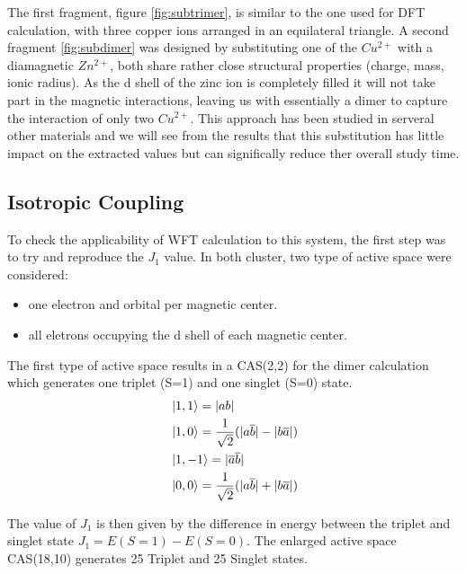 \documentclass[10pt]{report}
\numberwithin{equation}{section}
\begin{document}
The first fragment, figure \ref{fig:subtrimer}, is similar to the one used for DFT calculation, with three copper ions arranged in an equilateral triangle. 
A second fragment \ref{fig:subdimer} was designed by substituting one of the $Cu^{2+}$ with a diamagnetic $Zn^{2+}$, both share rather close structural properties (charge, mass, ionic radius).
As the d shell of the zinc ion is completely filled it will not take part in the magnetic interactions, leaving us with essentially a dimer to capture the interaction of only two $Cu^{2+}$. 
This approach has been studied in serveral other materials and we will see from the results that this substitution has little impact on the extracted values but can significally reduce ther overall study time.

\subsection{Isotropic Coupling}

To check the applicability of WFT calculation to this system, the first step was to try and reproduce the $J_1$ value.
In both cluster, two type of active space were considered:
\begin{itemize}
    \item one electron and orbital per magnetic center.
    \item all eletrons occupying the d shell of each magnetic center.
\end{itemize}

The first type of active space results in a CAS(2,2) for the dimer calculation which generates one triplet (S=1) and one singlet (S=0) state.
\begin{align}
    &\ket{1,1}=|ab|\\
    &\ket{1,0}=\frac{1}{\sqrt{2}}(|a\overline{b}|-|b\overline{a}|)\\
    &\ket{1,-1}=|\overline{a}\overline{b}|\\
    &\ket{0,0}=\frac{1}{\sqrt{2}}(|a\overline{b}|+|b\overline{a}|)
\end{align}

The value of $J_1$ is then given by the difference in energy between the triplet and singlet state $J_1=E(S=1)-E(S=0)$.
The enlarged active space CAS(18,10) generates 25 Triplet and 25 Singlet states.
\end{document}
